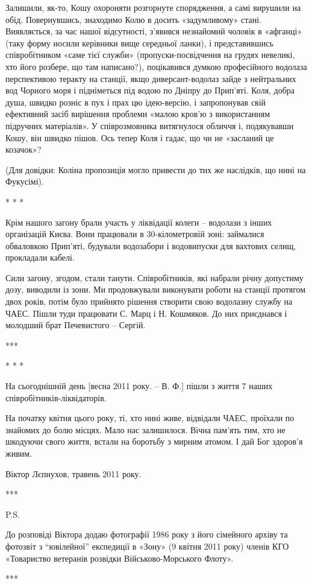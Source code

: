 Залишили, як-то, Кошу охороняти розгорнуте спорядження, а самі вирушили на
обід. Повернувшись, знаходимо Колю в досить «задумливому» стані. Виявляється,
за час нашої відсутності, з'явився незнайомий чоловік в «афганці» (таку форму
носили керівники вище середньої ланки), і представившись співробітником «саме
тієї служби» (пропуски-посвідчення на грудях невеликі, хто його розбере, що там
написано?), поцікавився думкою професійного водолаза перспективою теракту на
станції, якщо диверсант-водолаз зайде з нейтральних вод Чорного моря і
підніметься під водою по Дніпру до Прип'яті. Коля, добра душа, швидко розніс в
пух і прах цю ідею-версію, і запропонував свій ефективний засіб вирішення
проблеми «малою кров'ю з використанням підручних матеріалів». У співрозмовника
витягнулося обличчя і, подякувавши Кошу, він швидко пішов. Ось тепер Коля і
гадає, що чи не «засланий це козачок»? 

(Для довідки: Коліна пропозиція могло привести до тих же наслідків, що нині на
Фукусімі).

* * *

Крім нашого загону брали участь у ліквідації колеги – водолази з інших
організацій Києва. Вони працювали в 30-кілометровій зоні: займалися обваловкою
Прип'яті, будували водозабори і водовипуски для вахтових селищ, прокладали
кабелі.

Сили загону, згодом, стали танути. Співробітників, які набрали річну допустиму
дозу, виводили із зони. Ми продовжували виконувати роботи на станції протягом
двох років, потім було прийнято рішення створити свою водолазну службу на ЧАЕС.
Пішли туди працювати С. Марц і Н. Кошмяков. До них приєднався і молодший брат
Печевистого – Сергій.

***

* * *

На сьогоднішній день [весна 2011 року. – В. Ф.] пішли з життя 7 наших
співробітників-ліквідаторів. 

На початку квітня цього року, ті, хто нині живе, відвідали ЧАЕС, проїхали по
знайомих до болю місцях. Мало нас залишилося. Вічна пам'ять тим, хто не
шкодуючи свого життя, встали на боротьбу з мирним атомом. І дай Бог здоров'я
живим.

Віктор Лєпнухов, травень 2011 року.

***

P.S.

До розповіді Віктора додаю фотографії 1986 року з його сімейного архіву та
фотозвіт з \enquote{ювілейної} експедиції в «Зону» (9 квітня 2011 року) членів КГО
«Товариство ветеранів розвідки Військово-Морського Флоту».

***
